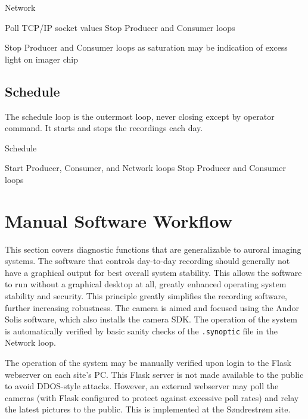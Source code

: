 \begin{algorithm}
	\caption{Network}
	\begin{algorithmic}
		\State Poll TCP/IP socket values
		\State Stop Producer and Consumer loops
		\EndIf
		\EndWhile
		\EndProcedure
		
		\State Stop Producer and Consumer loops as saturation may be indication of excess light on imager chip
		\EndIf
		\EndWhile
		\EndProcedure
	\end{algorithmic}
\end{algorithm}

\subsection*{Schedule}
The schedule loop is the outermost loop, never closing except by operator command.
It starts and stops the recordings each day.
\begin{algorithm}
	\caption{Schedule}
	\begin{algorithmic}
		\Repeat
		\If{SZA $> 100^\circ$}
		\State Start Producer, Consumer, and Network loops
		\EndIf
		\If{SZA $< 100^\circ$}
		\State Stop Producer and Consumer loops
		\EndIf
		\Until{Operator Shutdown}
	\end{algorithmic}
\end{algorithm}

\section{Manual Software Workflow}\label{sec:ManWork}
This section covers diagnostic functions that are generalizable to auroral imaging systems.
The software that controls day-to-day recording should generally not have a graphical output for best overall system stability.
This allows the software to run without a graphical desktop at all, greatly enhanced operating system stability and security.
This principle greatly simplifies the recording software, further increasing robustness.
The camera is aimed and focused using the Andor Solis software, which also installs the camera SDK.
The operation of the system is automatically verified by basic sanity checks of the \texttt{.synoptic} file in the Network loop.


The operation of the system may be manually verified upon login to the Flask webserver on each site's PC.
This Flask server is not made available to the public to avoid DDOS-style attacks.
However, an external webserver may poll the cameras (with Flask configured to protect against excessive poll rates) and relay the latest pictures to the public.
This is implemented at the Søndrestrøm site.


